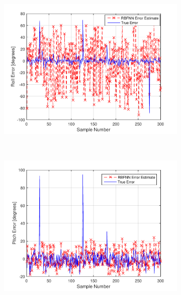 \begin{figure}
  \begin{subfigure}{0.3\textwidth}
    \includegraphics[width=\textwidth]{figures/chapter4/roll_valid}
    \caption{}
    \label{fig:rbfnn-valid-roll}
  \end{subfigure}
~
  \begin{subfigure}{0.3\textwidth}
    \includegraphics[width=\textwidth]{figures/chapter4/pitch_valid}
    \caption{}
  \end{subfigure}
~
  \begin{subfigure}{0.3\textwidth}

\end{subfigure}
\end{figure}
